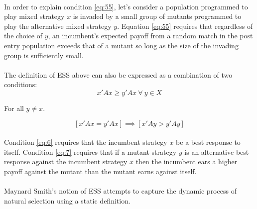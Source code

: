\paragraph{}In order to explain condition \ref{eq:55}, let's consider a population programmed to play mixed strategy $x$ is invaded by a small group of mutants programmed to play the alternative mixed strategy $y$. Equation \ref{eq:55} requires that regardless of the choice of $y$, an incumbent's expected payoff from a random match in the post entry population exceeds that of a mutant so long as the size of the invading group is sufficiently small.
\paragraph{}The definition of ESS above can also be expressed as a combination of two conditions: 
\begin{equation}\label{eq:6}
x' A x \geq y' A x  \: \forall  \: y \in X
\end{equation}
\begin{center}
For all $y \neq x.$
\end{center}
\begin{equation}\label{eq:7}
[x' A x = y' A x] \implies [x' A y > y' A y]
\end{equation}
\paragraph{}Condition \ref{eq:6} requires that the incumbent strategy $x$ be a best response to itself. Condition \ref{eq:7} requires that if a mutant strategy $y$ is an alternative best response against the incumbent strategy $x$ then the incumbent ears a higher payoff against the mutant than the mutant earns against itself.
\paragraph{}Maynard Smith's notion of ESS attempts to capture the dynamic process of natural selection using a static definition.



